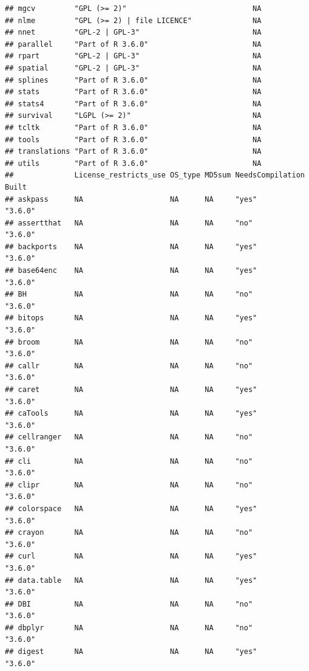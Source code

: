 \documentclass[]{article}
\begin{document}
\begin{verbatim}
## mgcv         "GPL (>= 2)"                             NA             
## nlme         "GPL (>= 2) | file LICENCE"              NA             
## nnet         "GPL-2 | GPL-3"                          NA             
## parallel     "Part of R 3.6.0"                        NA             
## rpart        "GPL-2 | GPL-3"                          NA             
## spatial      "GPL-2 | GPL-3"                          NA             
## splines      "Part of R 3.6.0"                        NA             
## stats        "Part of R 3.6.0"                        NA             
## stats4       "Part of R 3.6.0"                        NA             
## survival     "LGPL (>= 2)"                            NA             
## tcltk        "Part of R 3.6.0"                        NA             
## tools        "Part of R 3.6.0"                        NA             
## translations "Part of R 3.6.0"                        NA             
## utils        "Part of R 3.6.0"                        NA             
##              License_restricts_use OS_type MD5sum NeedsCompilation Built  
## askpass      NA                    NA      NA     "yes"            "3.6.0"
## assertthat   NA                    NA      NA     "no"             "3.6.0"
## backports    NA                    NA      NA     "yes"            "3.6.0"
## base64enc    NA                    NA      NA     "yes"            "3.6.0"
## BH           NA                    NA      NA     "no"             "3.6.0"
## bitops       NA                    NA      NA     "yes"            "3.6.0"
## broom        NA                    NA      NA     "no"             "3.6.0"
## callr        NA                    NA      NA     "no"             "3.6.0"
## caret        NA                    NA      NA     "yes"            "3.6.0"
## caTools      NA                    NA      NA     "yes"            "3.6.0"
## cellranger   NA                    NA      NA     "no"             "3.6.0"
## cli          NA                    NA      NA     "no"             "3.6.0"
## clipr        NA                    NA      NA     "no"             "3.6.0"
## colorspace   NA                    NA      NA     "yes"            "3.6.0"
## crayon       NA                    NA      NA     "no"             "3.6.0"
## curl         NA                    NA      NA     "yes"            "3.6.0"
## data.table   NA                    NA      NA     "yes"            "3.6.0"
## DBI          NA                    NA      NA     "no"             "3.6.0"
## dbplyr       NA                    NA      NA     "no"             "3.6.0"
## digest       NA                    NA      NA     "yes"            "3.6.0"

\end{verbatim}
\end{document}
